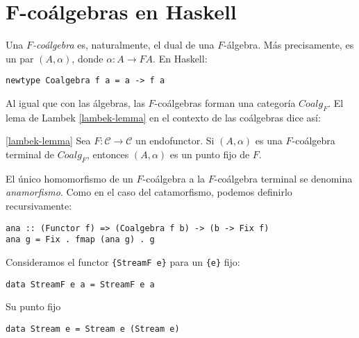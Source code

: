 \documentclass[12pt, twoside]{book}
\newcommand{\newterm}[1]{\index{#1}\emph{#1}}
\newcommand{\code}[1]{\Verb+{#1}+}
\newcommand{\cat}{{\mathcal{C}}}
\begin{document}
\section{F-coálgebras en Haskell}
Una \emph{$F$-coálgebra} es, naturalmente, el dual de una $F$-álgebra.
Más precisamente, es un par $(A,\alpha)$, donde $\alpha \colon A \to F A$.
En Haskell:
\begin{verbatim}
newtype Coalgebra f a = a -> f a
\end{verbatim}

Al igual que con las álgebras, las $F$-coálgebras forman una categoría $Coalg_F$.
El lema de Lambek \eqref{lambek-lemma} en el contexto de las coálgebras dice así:
\begin{lemma}\ref{lambek-lemma}
Sea $F \colon \cat \to \cat$ un endofunctor.
Si $(A,\alpha)$ es una $F$-coálgebra terminal de $Coalg_F$, entonces $(A,\alpha)$ es un punto fijo de $F$.
\end{lemma}

El único homomorfismo de un $F$-coálgebra a la $F$-coálgebra terminal se denomina \newterm{anamorfismo}.
Como en el caso del catamorfismo, podemos definirlo recursivamente:
\begin{verbatim}
ana :: (Functor f) => (Coalgebra f b) -> (b -> Fix f)
ana g = Fix . fmap (ana g) . g
\end{verbatim}

\begin{example}
Consideramos el functor \code{StreamF e} para un \code{e} fijo:
\begin{verbatim}
data StreamF e a = StreamF e a
\end{verbatim}
Su punto fijo
\begin{verbatim}
data Stream e = Stream e (Stream e)
\end{verbatim}
\end{example}

\backmatter




\printindex
\end{document}
